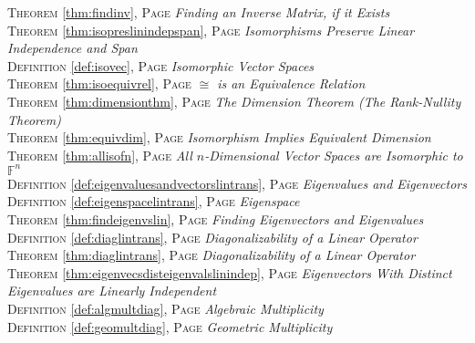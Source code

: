 \begin{multicols}{2}
{\textsc{Theorem} \ref{thm:findinv}, \textsc{Page} \pageref{thm:findinv} \textit{Finding an Inverse Matrix, if it Exists} \\
\textsc{Theorem} \ref{thm:isopreslinindepspan}, \textsc{Page} \pageref{thm:isopreslinindepspan} \textit{Isomorphisms Preserve Linear Independence and Span} \\
\textsc{Definition} \ref{def:isovec}, \textsc{Page} \pageref{def:isovec} \textit{Isomorphic Vector Spaces} \\
\textsc{Theorem} \ref{thm:isoequivrel}, \textsc{Page} \pageref{thm:isoequivrel} \textit{\(\cong \) is an Equivalence Relation} \\
\textsc{Theorem} \ref{thm:dimensionthm}, \textsc{Page} \pageref{thm:dimensionthm} \textit{The Dimension Theorem (The Rank-Nullity Theorem)} \\
\textsc{Theorem} \ref{thm:equivdim}, \textsc{Page} \pageref{thm:equivdim} \textit{Isomorphism Implies Equivalent Dimension} \\
\textsc{Theorem} \ref{thm:allisofn}, \textsc{Page} \pageref{thm:allisofn} \textit{All \(n\)-Dimensional Vector Spaces are Isomorphic to \(\mathbb {F}^n\)} \\
\textsc{Definition} \ref{def:eigenvaluesandvectorslintrans}, \textsc{Page} \pageref{def:eigenvaluesandvectorslintrans} \textit{Eigenvalues and Eigenvectors} \\
\textsc{Definition} \ref{def:eigenspacelintrans}, \textsc{Page} \pageref{def:eigenspacelintrans} \textit{Eigenspace} \\
\textsc{Theorem} \ref{thm:findeigenvslin}, \textsc{Page} \pageref{thm:findeigenvslin} \textit{Finding Eigenvectors and Eigenvalues} \\
\textsc{Definition} \ref{def:diaglintrans}, \textsc{Page} \pageref{def:diaglintrans} \textit{Diagonalizability of a Linear Operator} \\
\textsc{Theorem} \ref{thm:diaglintrans}, \textsc{Page} \pageref{thm:diaglintrans} \textit{Diagonalizability of a Linear Operator} \\
\textsc{Theorem} \ref{thm:eigenvecsdisteigenvalslinindep}, \textsc{Page} \pageref{thm:eigenvecsdisteigenvalslinindep} \textit{Eigenvectors With Distinct Eigenvalues are Linearly Independent} \\
\textsc{Definition} \ref{def:algmultdiag}, \textsc{Page} \pageref{def:algmultdiag} \textit{Algebraic Multiplicity} \\
\textsc{Definition} \ref{def:geomultdiag}, \textsc{Page} \pageref{def:geomultdiag} \textit{Geometric Multiplicity} \\
}
\end{multicols}
